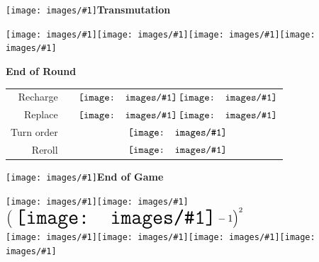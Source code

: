 \documentclass{article}
\newcommand\icon[2]{\texttt{[image: images/\#1]}}
\newcommand\etherialDie[1]{\icon{etherialDie.png}{#1}}
\newcommand\randomEssenceX[1]{\icon{randomEssenceX.png}{#1}}
\newcommand\randomTransmutation[1]{\icon{randomTransmutation.png}{#1}}
\newcommand\randomTransmutationArrow[1]{\icon{randomTransmutationArrow.png}{#1}}
\newcommand\artifact[1]{\icon{artifact.png}{#1}}
\newcommand\rechargeArtifact[1]{\icon{rechargeArtifact.png}{#1}}
\newcommand\performArtifact[1]{\icon{performArtifact.png}{#1}}
\newcommand\experiment[1]{\icon{experiment.png}{#1}}
\newcommand\rechargeReaction[1]{\icon{rechargeReaction.png}{#1}}
\newcommand\gold[1]{\icon{gold.png}{#1}}
\newcommand\masteryTrack[1]{\icon{masteryTrack.png}{#1}}
\newcommand\vp[1]{\icon{vp.png}{#1}}
\newcommand\numberOfFormulas[1]{\icon{numberOfFormulas.png}{#1}}
\newcommand\publication[1]{\icon{publication.png}{#1}}
\newcommand\achievement[1]{\icon{achievement.png}{#1}}
\newcommand\turnOrder[1]{\icon{turnOrder.png}{#1}}
\newcommand\dice[1]{\icon{dice.png}{#1}}
\newcommand\advanceMasteryTrack[1]{\icon{advanceMasteryTrack.png}{#1}}
\begin{document}
\newpage
\thispagestyle{empty}
\BgThispage
\vspace*{3em}
\begin{center}
\huge\randomTransmutation{.8em}\quad\Huge\bf Transmutation
\end{center}
\vspace*{1em}
\begin{center}
\huge
\randomTransmutationArrow{3em}\qquad\qquad\randomEssenceX{3em}\qquad\qquad\advanceMasteryTrack{3em}\qquad\qquad\performArtifact{3em}
\end{center}
\vspace*{3em}
\begin{center}
\Huge\bf End of Round
\end{center}
\begin{center}
\huge
\begin{tabular}{rcc}
Recharge&&$\vcenter{\hbox{\rechargeArtifact{1em}}}$\quad$\vcenter{\hbox{\rechargeReaction{1.5em}}}$\\[1em]
Replace&&$\vcenter{\hbox{\artifact{1em}}}$\quad$\vcenter{\hbox{\experiment{1.5em}}}$\\[1em]
Turn order&&$\vcenter{\hbox{\turnOrder{1em}}}$\\[1em]
Reroll&&$\vcenter{\hbox{\dice{1em}}}$\\[1em]
\end{tabular}
\end{center}
\vspace*{3em}
\begin{center}
	\huge\vp{.8em}\quad\Huge\bf End of Game
\end{center}
\vspace*{1em}
\begin{center}
\huge
\gold{1.5em}\qquad\etherialDie{1.5em}\\[1.3em]
$\left(\ \vcenter{\hbox{\huge\numberOfFormulas{1.5em}}}-1\right)^2$\\[1.8em]
\experiment{1.5em}\quad\publication{1.5em}\quad\achievement{1.5em}\quad\masteryTrack{1em}\\[1.5em]
\end{center}
\end{document}
